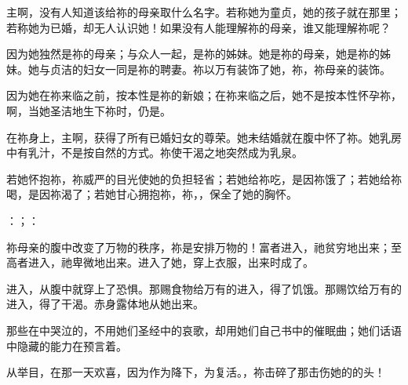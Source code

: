 主啊，没有人知道该给祢的母亲取什么名字。若称她为童贞，她的孩子就在那里；若称她为已婚，却无人认识她！如果没有人能理解祢的母亲，谁又能理解祢呢？\par

因为她独然是祢的母亲；与众人一起，是祢的姊妹。她是祢的母亲，她是祢的姊妹。她与贞洁的妇女一同是祢的聘妻。祢以万有装饰了她，祢，祢母亲的装饰。\par

因为她在祢来临之前，按本性是祢的新娘；在祢来临之后，她不是按本性怀孕祢，啊，当她圣洁地生下祢时，仍是。\par

在祢身上，主啊，获得了所有已婚妇女的尊荣。她未结婚就在腹中怀了祢。她乳房中有乳汁，不是按自然的方式。祢使干渴之地突然成为乳泉。\par

若她怀抱祢，祢威严的目光使她的负担轻省；若她给祢吃，是因祢饿了；若她给祢喝，是因祢渴了；若她甘心拥抱祢，祢，，保全了她的胸怀。\par

：；：\par

祢母亲的腹中改变了万物的秩序，祢是安排万物的！富者进入，祂贫穷地出来；至高者进入，祂卑微地出来。进入了她，穿上衣服，出来时成了。\par

进入，从腹中就穿上了恐惧。那赐食物给万有的进入，得了饥饿。那赐饮给万有的进入，得了干渴。赤身露体地从她出来。\par

那些在中哭泣的，不用她们圣经中的哀歌，却用她们自己书中的催眠曲；她们话语中隐藏的能力在预言着。\par

从举目，在那一天欢喜，因为作为降下，为复活。，祢击碎了那击伤她的的头！\par

